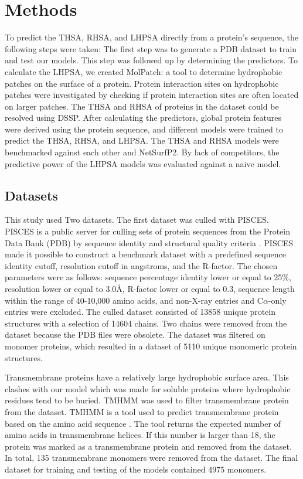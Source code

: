 \documentclass[11pt,a4paper]{article}
\begin{document}
\section{Methods}

To predict the THSA, RHSA, and LHPSA directly from a protein's sequence, the following steps were taken: The first step was to generate a PDB dataset to train and test our models. This step was followed up by determining the predictors. To calculate the LHPSA, we created MolPatch: a tool to determine hydrophobic patches on the surface of a protein. Protein interaction sites on hydrophobic patches were investigated by checking if protein interaction sites are often located on larger patches. The THSA and RHSA of proteins in the dataset could be resolved using DSSP. After calculating the predictors, global protein features were derived using the protein sequence, and different models were trained to predict the THSA, RHSA, and LHPSA. The THSA and RHSA models were benchmarked against each other and NetSurfP2. By lack of competitors, the predictive power of the LHPSA models was evaluated against a naive model.

\subsection{Datasets}
This study used Two datasets. The first dataset was culled with PISCES. PISCES is a public server for culling sets of protein sequences from the Protein Data Bank (PDB) by sequence identity and structural quality criteria \cite{wang2003pisces}. PISCES made it possible to construct a benchmark dataset with a predefined sequence identity cutoff, resolution cutoff in angstroms, and the R-factor. The chosen parameters were as follows: sequence percentage identity lower or equal to 25\%, resolution lower or equal to 3.0\si{\angstrom}, R-factor lower or equal to 0.3, sequence length within the range of 40-10,000 amino acids,  and non-X-ray entries and C$\alpha$-only entries were excluded. The culled dataset consisted of 13858 unique protein structures with a selection of 14604 chains. Two chains were removed from the dataset because the PDB files were obsolete. The dataset was filtered on monomer proteins, which resulted in a dataset of 5110 unique monomeric protein structures.

Transmembrane proteins have a relatively large hydrophobic surface area. This clashes with our model which was made for soluble proteins where hydrophobic residues tend to be buried. TMHMM was used to filter transmembrane protein from the dataset. TMHMM is a tool used to predict transmembrane protein based on the amino acid sequence \cite{sonnhammer1998hidden,moller2001evaluation}. The tool returns the expected number of amino acids in transmembrane helices. If this number is larger than 18, the protein was marked as a transmembrane protein and removed from the dataset. In total, 135 transmembrane monomers were removed from the dataset. The final dataset for training and testing of the models contained 4975 monomers.
\end{document}
